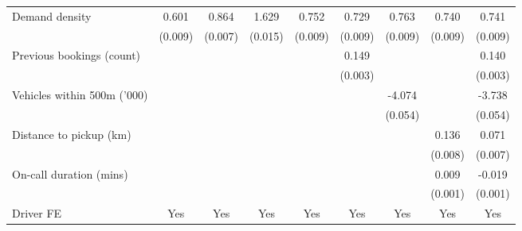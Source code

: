 \documentclass[reviewmode]{AEA}
\begin{document}
\begin{landscape}
\begin{table}
{\begin{tabular}{l*{8}{S}}
				Demand density      &       0.601&       0.864&       1.629&       0.752&       0.729&       0.763&       0.740&       0.741\\
				                    &     (0.009)         &     (0.007)         &     (0.015)         &     (0.009)         &     (0.009)         &     (0.009)         &     (0.009)         &     (0.009)         \\
				\addlinespace
				Previous bookings (count)&                     &                     &                     &                     &       0.149&                     &                     &       0.140\\
				                    &                     &                     &                     &                     &     (0.003)         &                     &                     &     (0.003)         \\
				\addlinespace
				Vehicles within 500m ('000)&                     &                     &                     &                     &                     &      -4.074&                     &      -3.738\\
				                    &                     &                     &                     &                     &                     &     (0.054)         &                     &     (0.054)         \\
				\addlinespace
				Distance to pickup (km)&                     &                     &                     &                     &                     &                     &       0.136&       0.071\\
				                    &                     &                     &                     &                     &                     &                     &     (0.008)         &     (0.007)         \\
				\addlinespace
				On-call duration (mins)&                     &                     &                     &                     &                     &                     &       0.009&      -0.019\\
				                    &                     &                     &                     &                     &                     &                     &     (0.001)         &     (0.001)         \\
				\addlinespace
				Driver FE           &       {Yes}         &       {Yes}         &       {Yes}         &       {Yes}         &       {Yes}         &       {Yes}         &       {Yes}         &       {Yes}         \\

\end{tabular}}
\end{table}
\end{landscape}
\end{document}
